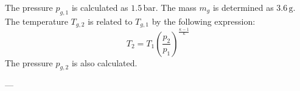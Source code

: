The pressure \( p_{g,1} \) is calculated as \( 1.5 \, \text{bar} \). The mass \( m_g \) is determined as \( 3.6 \, \text{g} \). The temperature \( T_{g,2} \) is related to \( T_{g,1} \) by the following expression:  
\[
T_2 = T_1 \left( \frac{p_2}{p_1} \right)^{\frac{\kappa - 1}{\kappa}}
\]  
The pressure \( p_{g,2} \) is also calculated.

---